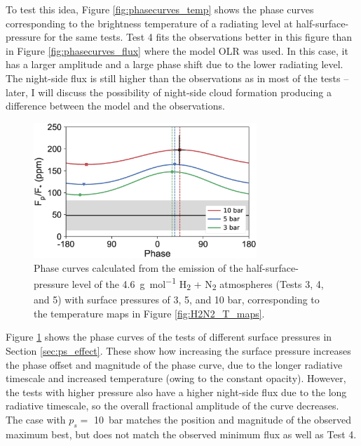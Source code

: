 To test this idea, Figure \ref{fig:phasecurves_temp} shows the phase curves corresponding to the brightness temperature of a radiating level at half-surface-pressure for the same tests. Test 4 fits the observations better in this figure than in Figure \ref{fig:phasecurves_flux} where the model OLR was used. In this case, it has  a larger amplitude and a large phase shift due to the lower radiating level. The night-side flux is still higher than the observations as in most of the tests -- later, I will discuss the possibility of night-side cloud formation producing a difference between the model and the observations.

%
\begin{figure}
\centering
\includegraphics[width=0.75\textwidth]{figures/linking-climate-55cnce/phasecurves_vary_p.eps}
\caption{Phase curves calculated from the emission of the half-surface-pressure level of the \SI{4.6}{\gram\per\mole} H\textsubscript{2} + N\textsubscript{2} atmospheres (Tests 3, 4, and 5) with surface pressures of 3, 5, and 10 bar, corresponding to the temperature maps in Figure \ref{fig:H2N2_T_maps}.\label{fig:phasecurves_H2N2}}
\end{figure}


Figure \ref{fig:phasecurves_H2N2} shows the phase curves of the tests of different surface pressures in Section \ref{sec:ps_effect}. These show how increasing the surface pressure increases the phase offset and magnitude of the phase curve, due to the longer radiative timescale and increased temperature (owing to the constant opacity). However, the tests with higher pressure also have a higher night-side flux due to the long radiative timescale, so the overall fractional amplitude of the curve decreases. The case with $p_{s}=$ \SI{10}{\bar} matches the position and magnitude of the observed maximum best, but does not match the observed minimum flux as well as Test 4.



